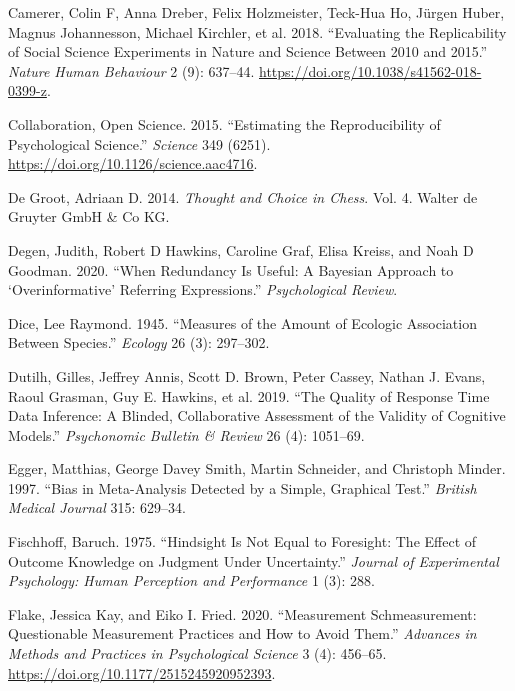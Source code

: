 \documentclass[
  12pt,
]{article}
\newlength{\cslhangindent}
\newenvironment{CSLReferences}[2] %
 {%
  \setlength{\parindent}{0pt}
  \ifodd #1 \everypar{\setlength{\hangindent}{\cslhangindent}}\ignorespaces\fi
  \ifnum #2 > 0
  \setlength{\parskip}{#2\baselineskip}
  \fi
 }%
 {}
\begin{document}
\begin{CSLReferences}{1}{0}
\leavevmode{}%
Camerer, Colin F, Anna Dreber, Felix Holzmeister, Teck-Hua Ho, Jürgen Huber, Magnus Johannesson, Michael Kirchler, et al. 2018. {``Evaluating the Replicability of Social Science Experiments in Nature and Science Between 2010 and 2015.''} \emph{Nature Human Behaviour} 2 (9): 637--44. \url{https://doi.org/10.1038/s41562-018-0399-z}.

\leavevmode{}%
Collaboration, Open Science. 2015. {``Estimating the Reproducibility of Psychological Science.''} \emph{Science} 349 (6251). \url{https://doi.org/10.1126/science.aac4716}.

\leavevmode{}%
De Groot, Adriaan D. 2014. \emph{Thought and Choice in Chess}. Vol. 4. Walter de Gruyter GmbH \& Co KG.

\leavevmode{}%
Degen, Judith, Robert D Hawkins, Caroline Graf, Elisa Kreiss, and Noah D Goodman. 2020. {``When Redundancy Is Useful: A Bayesian Approach to {`Overinformative'} Referring Expressions.''} \emph{Psychological Review}.

\leavevmode{}%
Dice, Lee Raymond. 1945. {``Measures of the Amount of Ecologic Association Between Species.''} \emph{Ecology} 26 (3): 297--302.

\leavevmode{}%
Dutilh, Gilles, Jeffrey Annis, Scott D. Brown, Peter Cassey, Nathan J. Evans, Raoul Grasman, Guy E. Hawkins, et al. 2019. {``The Quality of Response Time Data Inference: A Blinded, Collaborative Assessment of the Validity of Cognitive Models.''} \emph{Psychonomic Bulletin \& Review} 26 (4): 1051--69.

\leavevmode{}%
Egger, Matthias, George Davey Smith, Martin Schneider, and Christoph Minder. 1997. {``Bias in Meta-Analysis Detected by a Simple, Graphical Test.''} \emph{British Medical Journal} 315: 629--34.

\leavevmode{}%
Fischhoff, Baruch. 1975. {``Hindsight Is Not Equal to Foresight: The Effect of Outcome Knowledge on Judgment Under Uncertainty.''} \emph{Journal of Experimental Psychology: Human Perception and Performance} 1 (3): 288.

\leavevmode{}%
Flake, Jessica Kay, and Eiko I. Fried. 2020. {``Measurement Schmeasurement: Questionable Measurement Practices and How to Avoid Them.''} \emph{Advances in Methods and Practices in Psychological Science} 3 (4): 456--65. \url{https://doi.org/10.1177/2515245920952393}.


\end{CSLReferences}
\end{document}
